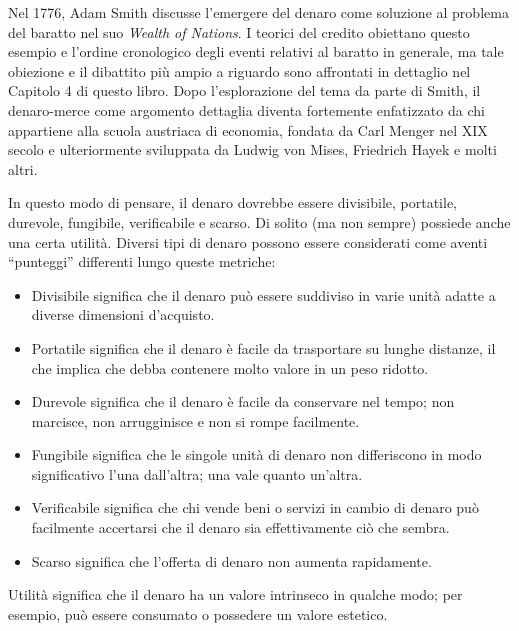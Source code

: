 \documentclass[
  a5paper,
  smalldemyvopaper,10pt,twoside,onecolumn,openright,extrafontsizes,hidelinks]{memoir}
\begin{document}
Nel 1776, Adam Smith discusse l'emergere del denaro come soluzione al
problema del baratto nel suo \emph{Wealth of Nations}. I teorici del
credito obiettano questo esempio e l'ordine cronologico degli eventi
relativi al baratto in generale, ma tale obiezione e il dibattito più
ampio a riguardo sono affrontati in dettaglio nel Capitolo 4 di questo
libro. Dopo l'esplorazione del tema da parte di Smith, il denaro-merce
come argomento dettaglia diventa fortemente enfatizzato da chi
appartiene alla scuola austriaca di economia, fondata da Carl Menger nel
XIX secolo e ulteriormente sviluppata da Ludwig von Mises, Friedrich
Hayek e molti altri.

In questo modo di pensare, il denaro dovrebbe essere divisibile,
portatile, durevole, fungibile, verificabile e scarso. Di solito (ma non
sempre) possiede anche una certa utilità. Diversi tipi di denaro possono
essere considerati come aventi ``punteggi'' differenti lungo queste
metriche:

\begin{itemize}
\item
  Divisibile significa che il denaro può essere suddiviso in varie unità
  adatte a diverse dimensioni d'acquisto.
\item
  Portatile significa che il denaro è facile da trasportare su lunghe
  distanze, il che implica che debba contenere molto valore in un peso
  ridotto.
\item
  Durevole significa che il denaro è facile da conservare nel tempo; non
  marcisce, non arrugginisce e non si rompe facilmente.
\item
  Fungibile significa che le singole unità di denaro non differiscono in
  modo significativo l'una dall'altra; una vale quanto un'altra.
\item
  Verificabile significa che chi vende beni o servizi in cambio di
  denaro può facilmente accertarsi che il denaro sia effettivamente ciò
  che sembra.
\item
  Scarso significa che l'offerta di denaro non aumenta rapidamente.
\end{itemize}

Utilità significa che il denaro ha un valore intrinseco in qualche modo;
per esempio, può essere consumato o possedere un valore estetico.
\end{document}
